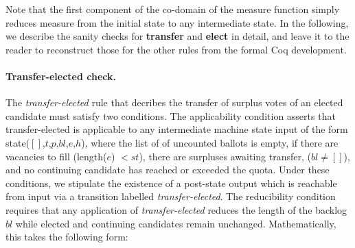\documentclass{llncs}
\begin{document}
\noindent
Note that the first component of the co-domain of the measure
function simply reduces measure from the initial state to any
intermediate state. In the following, we describe
the sanity checks for \textbf{transfer} and \textbf{elect} in detail, 
and leave it to the reader to reconstruct those for the other rules
from the formal Coq development.

\paragraph{Transfer-elected check.} The
\emph{transfer-elected}  rule that decribes the transfer
of surplus votes of an elected candidate 
must satisfy two conditions. The applicability condition
asserts that transfer-elected is applicable to 
any intermediate machine state \textsf{input} of the
form \textsf{state}($[]$,$t$,$p$,$bl$,$e$,$h$), where the list of of
uncounted ballots is empty, if there are vacancies to fill
(\textsf{length}($e$) $< st$), there are surpluses awaiting transfer,
($bl \neq []$), and no continuing candidate has reached or
exceeded the quota. Under these conditions, we stipulate the
existence of a post-state 
\textsf{output} which is reachable from \textsf{input} via a
transition labelled \emph{transfer-elected}. 
The reducibility condition requires that any application of
\emph{transfer-elected} reduces the length of the backlog
$\mathit{bl}$ while elected and continuing candidates remain
unchanged.  Mathematically, this takes the following form:
\end{document}
